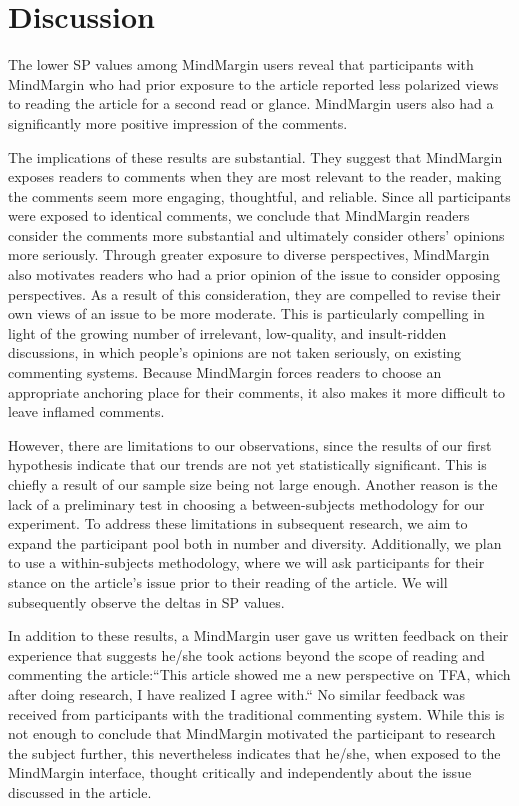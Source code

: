 \section{Discussion}

The lower SP values among MindMargin users reveal that participants with MindMargin who had prior exposure to the article reported less polarized views to reading the article for a second read or glance. MindMargin users also had a significantly more positive impression of the comments. 

The implications of these results are substantial. They suggest that MindMargin exposes readers to comments when they are most relevant to the reader, making the comments seem more engaging, thoughtful, and reliable. Since all participants were exposed to identical comments, we conclude that MindMargin readers consider the comments more substantial and ultimately consider others' opinions more seriously. Through greater exposure to diverse perspectives, MindMargin also motivates readers who had a prior opinion of the issue to consider opposing perspectives. As a result of this consideration, they are compelled to revise their own views of an issue to be more moderate. This is particularly compelling in light of the growing number of irrelevant, low-quality, and insult-ridden discussions, in which people's opinions are not taken seriously, on existing commenting systems. Because MindMargin  forces readers to choose an appropriate anchoring place for their comments, it also makes it more difficult to leave inflamed comments. 

However, there are limitations to our observations, since the results of our first hypothesis indicate that our trends are not yet statistically significant. This is chiefly a result of our sample size being not large enough. Another reason is the lack of a preliminary test in choosing a between-subjects methodology for our experiment. To address these limitations in subsequent research, we aim to expand the participant pool both in number and diversity. Additionally, we plan to use a within-subjects methodology, where we will ask participants for their stance on the article's issue prior to their reading of the article. We will subsequently observe the deltas in SP values.

In addition to these results, a MindMargin user gave us written feedback on their experience that suggests he/she took actions beyond the scope of reading and commenting the article:``This article showed me a new perspective on TFA, which after doing research, I have realized I agree with.`` No similar feedback was received from participants with the traditional commenting system. While this is not enough to conclude that MindMargin motivated the participant to research the subject further, this nevertheless indicates that he/she, when exposed to the MindMargin interface, thought critically and independently about the issue discussed in the article.